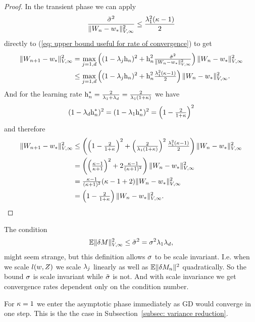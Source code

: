 \begin{proof}
	In the transient phase we can apply
	\begin{align*}
		\frac{\tilde{\sigma}^2}{
			\|W_n-w_*\|_{V,\infty}^2
		}
		\le \frac{\lambda_1^2(\kappa-1)}{2}
	\end{align*}
	directly to (\ref{eq: upper bound useful for rate of convergence}) to get
	\begin{align*}
		\|W_{n+1}-w_*\|_{V,\infty}^2
		&= \max_{j=1,d}\left((1- \lambda_j\text{h}_n)^2
			+\text{h}_n^2\tfrac{\tilde{\sigma}^2}{\|W_n-w_*\|_{V,\infty}^2}
		\right)\|W_n-w_*\|_{V,\infty}^2\\
		&\le \max_{j=1,d}\left((1- \lambda_j\text{h}_n)^2
			+\text{h}_n^2\tfrac{\lambda_1^2(\kappa-1)}{2}
		\right)\|W_n-w_*\|_{V,\infty}^2.
	\end{align*}
	And for the learning rate \(\text{h}_n^*=\tfrac{2}{\lambda_1+\lambda_d}=\tfrac{2}{\lambda_1(1+\kappa)}\)
	we have
	\begin{align*}
		(1-\lambda_d\text{h}_n^*)^2
		= (1-\lambda_1\text{h}_n^*)^2
		= \left(1-\tfrac{2}{1+\kappa}\right)^2
	\end{align*}
	and therefore
	\begin{align*}
		\|W_{n+1}-w_*\|_{V,\infty}^2
		&\le \left(\left(1-\tfrac{2}{1+\kappa}\right)^2
			+\left(\tfrac{2}{\lambda_1(1+\kappa)}\right)^2\tfrac{\lambda_1^2(\kappa-1)}{2}
		\right)\|W_n-w_*\|_{V,\infty}^2\\
		&=\left(
			\left(\tfrac{\kappa-1}{\kappa+1}\right)^2 + 2 \tfrac{\kappa-1}{(\kappa+1)^2}
		\right)\|W_n-w_*\|_{V,\infty}^2\\
		&= \tfrac{\kappa-1}{(\kappa+1)^2}(\kappa-1 + 2)\|W_n-w_*\|_{V,\infty}^2\\
		&= \left(1-\tfrac{2}{1+\kappa}\right)\|W_n - w_*\|_{V,\infty}^2.
		\qedhere
	\end{align*}
\end{proof}
\begin{remark}
	The condition
	\begin{align*}
		\mathbb{E}\|\delta M\|_{V,\infty}^2
		\le \tilde{\sigma}^2 = \sigma^2 \lambda_1\lambda_d,
	\end{align*}
	might seem strange, but this definition allows \(\sigma\) to be scale
	invariant. I.e. when we scale \(l(w, Z)\) we scale \(\lambda_j\)
	linearly as well as \(\mathbb{E}\|\delta M_n\|^2\) quadratically. So the
	bound \(\sigma\) is scale invariant while \(\tilde{\sigma}\) is not.
	And with scale invariance we get convergence rates dependent only on the
	condition number.
\end{remark}
\begin{remark}
	For \(\kappa=1\) we enter the asymptotic phase immediately as GD would
	converge in one step. This is the the case in Subsection~\ref{subsec:
	variance reduction}.
\end{remark}

